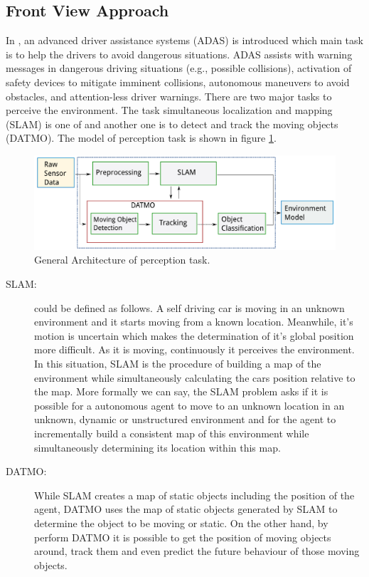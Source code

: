 \subsection{Front View Approach}
In \cite{Chavez_Garcia_2016}, an advanced driver assistance systems (ADAS) is introduced which main task is to help the drivers to avoid dangerous situations. ADAS assists with warning messages in dangerous driving situations (e.g., possible collisions), activation of safety devices to mitigate imminent collisions, autonomous maneuvers to avoid obstacles, and attention-less driver warnings\cite{Chavez_Garcia_2016}. There are two major tasks to perceive the environment. The task simultaneous localization and mapping (SLAM) is one of and another one is to detect and track the moving objects (DATMO). The model of perception task is shown in figure \ref{fig:datmoslam}.
\begin{figure}
  \centering
  \includegraphics[width=.4\textwidth]{src/pic/datmo_slam_arch.png}
  \caption{General Architecture of perception task. \cite{Chavez_Garcia_2016}}
  \label{fig:datmoslam}
\end{figure}
\begin{description}
    \item[SLAM:] could be defined as follows. A self driving car is moving in an unknown environment and it starts moving from a known location. Meanwhile, it's motion is uncertain which makes the determination of it's global position more difficult. As it is moving, continuously it perceives the environment. In this situation, SLAM is the procedure of building a map of the environment while simultaneously calculating the cars position relative to the map\cite{Thrun2008}. More formally we can say, the SLAM problem asks if it is possible for a autonomous agent to move to an unknown location in an unknown, dynamic or unstructured environment and for the agent to incrementally build a consistent map of this environment while simultaneously determining its location within this map\cite{Bailey:1638022}.
    \item[DATMO:] While SLAM creates a map of static objects including the position of the agent, DATMO uses the map  of static objects generated by SLAM \cite{Azim:6232303} to determine the object to be moving or static\cite{vu2008mapping}. On the other hand, by perform DATMO it is possible to get the position of moving objects around, track them and even predict the future behaviour of those moving objects\cite{vu2008mapping}.
\end{description}

